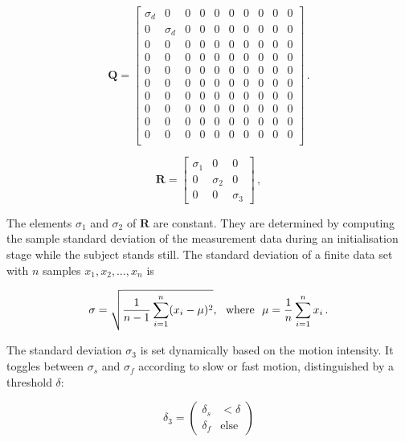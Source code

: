 \begin{equation}
\mathbf{Q} = \begin{bmatrix}
  \sigma_d & 0 & 0 & 0 & 0 & 0 & 0 & 0 & 0 & 0\\
  0 & \sigma_d & 0 & 0 & 0 & 0 & 0 & 0 & 0 & 0\\
  0 & 0 & 0 & 0 & 0 & 0 & 0 & 0 & 0 & 0\\
  0 & 0 & 0 & 0 & 0 & 0 & 0 & 0 & 0 & 0\\
  0 & 0 & 0 & 0 & 0 & 0 & 0 & 0 & 0 & 0\\
  0 & 0 & 0 & 0 & 0 & 0 & 0 & 0 & 0 & 0\\
  0 & 0 & 0 & 0 & 0 & 0 & 0 & 0 & 0 & 0\\
  0 & 0 & 0 & 0 & 0 & 0 & 0 & 0 & 0 & 0\\
  0 & 0 & 0 & 0 & 0 & 0 & 0 & 0 & 0 & 0\\
  0 & 0 & 0 & 0 & 0 & 0 & 0 & 0 & 0 & 0\\
\end{bmatrix}\,.
\end{equation}

\begin{equation}
\mathbf{R} = \begin{bmatrix}
  \sigma_1 & 0 & 0\\
  0 & \sigma_2 & 0\\
  0 & 0 & \sigma_3
\end{bmatrix}\,,
\end{equation}

\noindent
The elements $\sigma_1$ and $\sigma_2$ of $\mathbf{R}$ are constant. They are determined by computing the sample standard deviation of the measurement data during an initialisation stage while the subject stands still. The standard deviation of a finite data set with $n$ samples $x_1, x_2, \dots, x_n$ is

\begin{equation}
  \sigma = \sqrt{\frac{1}{n-1} \sum_{i=1}^n (x_i - \mu)^2}, {\rm \ \ where\ \ } \mu = \frac{1}{n} \sum_{i=1}^n x_i\,.
\end{equation}

\noindent
The standard deviation $\sigma_3$ is set dynamically based on the motion intensity. It toggles between $\sigma_s$ and $\sigma_f$ according to slow or fast motion, distinguished by a threshold $\delta$:

\begin{equation}
  \delta_3 = \begin{pmatrix}
  	\delta_s & < \delta\\
  	\delta_f & \mbox{else}
  \end{pmatrix}
\end{equation}

